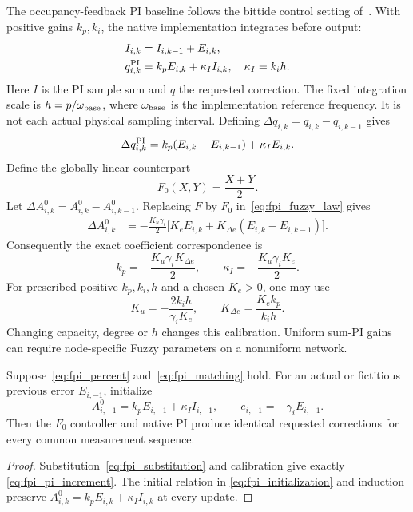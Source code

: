 The occupancy-feedback PI baseline follows the bittide control setting
of~\cite{lall2022resistance}. With positive gains $k_p,k_i$, the native
implementation integrates before output:
\begin{align}
 I_{i,k}&=I_{i,k-1}+E_{i,k},\nonumber\\
 q^{\rm PI}_{i,k}&=k_pE_{i,k}+\kappa_I I_{i,k},\quad\kappa_I=k_i h.
 \label{eq:fpi_native}
\end{align}
Here $I$ is the PI sample sum and $q$ the requested correction. The fixed
integration scale is $h=p/\omega_{\rm base}$, where
$\omega_{\rm base}$ is the implementation reference frequency.
It is not each actual physical sampling interval. Defining
$\Delta q_{i,k}=q_{i,k}-q_{i,k-1}$ gives
\begin{equation}
 \Delta q^{\rm PI}_{i,k}
 =k_p(E_{i,k}-E_{i,k-1})+\kappa_I E_{i,k}.
 \label{eq:fpi_pi_increment}
\end{equation}
Define the globally linear counterpart
\begin{equation}
 F_0(X,Y)=\frac{X+Y}{2}.
 \label{eq:fpi_f0}
\end{equation}
Let $\Delta A^0_{i,k}=A^0_{i,k}-A^0_{i,k-1}$. Replacing $F$ by $F_0$ in~\eqref{eq:fpi_fuzzy_law} gives
\begin{align}
 \Delta A^{0}_{i,k}
 &=-\frac{K_u\gamma_i}{2}\bigl[K_eE_{i,k}
                  +K_{\Delta e}(E_{i,k}-E_{i,k-1})\bigr].
 \label{eq:fpi_substitution}
\end{align}
Consequently the exact coefficient correspondence is
\begin{equation}
 \boxed{k_p=-\frac{K_u\gamma_iK_{\Delta e}}2,\qquad
        \kappa_I=-\frac{K_u\gamma_iK_e}2.}
 \label{eq:fpi_matching}
\end{equation}
For prescribed positive $k_p,k_i,h$ and a chosen $K_e>0$, one may use
\begin{equation}
 K_u=-\frac{2k_ih}{\gamma_iK_e},\qquad
 K_{\Delta e}=\frac{K_ek_p}{k_ih}.
 \label{eq:fpi_design_gains}
\end{equation}
Changing capacity, degree or $h$ changes this calibration. Uniform sum-PI
gains can require node-specific Fuzzy parameters on a nonuniform network.

\begin{btdproposition}
\label{prop:fpi_equivalence}
Suppose~\eqref{eq:fpi_percent} and~\eqref{eq:fpi_matching} hold. For an
actual or fictitious previous error $E_{i,-1}$, initialize
\begin{equation}
 A^0_{i,-1}=k_pE_{i,-1}+\kappa_I I_{i,-1},\qquad
 e_{i,-1}=-\gamma_iE_{i,-1}.
 \label{eq:fpi_initialization}
\end{equation}
Then the $F_0$ controller and native PI produce identical requested
corrections for every common measurement sequence.
\end{btdproposition}
\begin{proof}
Substitution~\eqref{eq:fpi_substitution} and calibration give exactly
\eqref{eq:fpi_pi_increment}. The initial relation in
\eqref{eq:fpi_initialization} and induction preserve
$A^0_{i,k}=k_pE_{i,k}+\kappa_I I_{i,k}$ at every update.
\end{proof}

